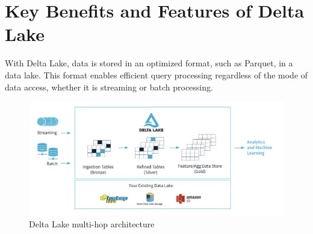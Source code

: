 \section{Key Benefits and Features of Delta Lake}
\begin{flushleft}
With Delta Lake, data is stored in an optimized format, such as Parquet, in a data lake. This format enables efficient query processing regardless of the mode of data access, whether it is streaming or batch processing.
\end{flushleft}

\begin{figure}[H]
\centering
\includegraphics[width=\linewidth]{images/delta_lake_architecture.png}
\caption{Delta Lake multi-hop architecture}\label{fig:delta-lake-architecture}
\end{figure}

